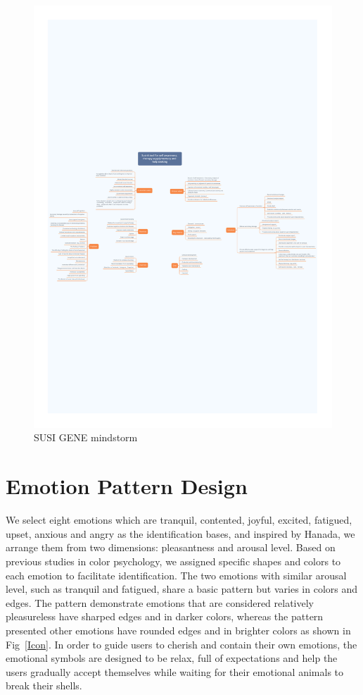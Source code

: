 \documentclass[manuscript,screen]{acmart}
\begin{document}
\begin{figure}[h]
  \centering
  \includegraphics[width=\linewidth]{Xmind.pdf}
  \caption{SUSI GENE mindstorm}
  \label{Xmind}
\end{figure}

\section{Emotion Pattern Design}

We select eight emotions which are tranquil, contented, joyful, excited, fatigued, upset, anxious and angry as the identification bases, and inspired by Hanada,\cite{hanada2018correspondence}
we arrange them from two dimensions: pleasantness and arousal level. Based on previous studies in color psychology,\cite{valdez1994effects}
we assigned specific shapes and colors to each emotion to facilitate identification. The two emotions with similar arousal level, such as tranquil and fatigued, share a basic pattern but varies in colors and edges. The pattern demonstrate emotions that are considered relatively pleasureless have sharped edges and in darker colors, whereas the pattern presented other emotions have rounded edges and in brighter colors as shown in Fig~\ref{Icon}. In order to guide users to cherish and contain their own emotions, the emotional symbols are designed to be relax, full of expectations and help the users gradually accept themselves while waiting for their emotional animals to break their shells.
\end{document}
